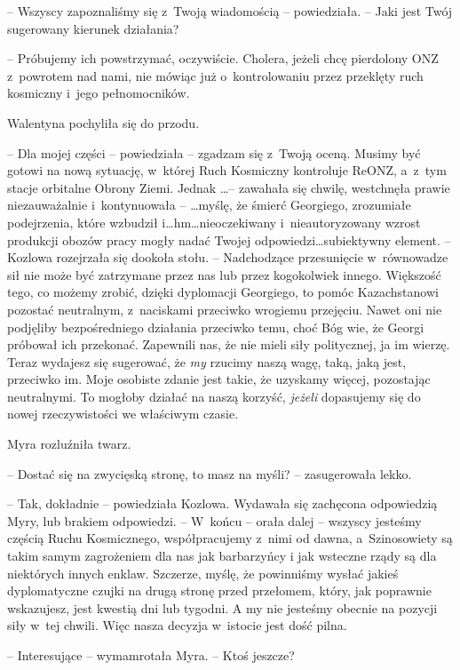\documentclass[oneside,polish,11pt,sfheadings]{mwbk}
\begin{document}
-- Wszyscy
zapoznaliśmy się z~Twoją wiadomością -- powiedziała. -- Jaki jest Twój
sugerowany kierunek działania?

-- Próbujemy ich powstrzymać, oczywiście. Cholera, jeżeli chcę pierdolony
ONZ z~powrotem nad nami, nie mówiąc już o~kontrolowaniu przez przeklęty
ruch kosmiczny i~jego pełnomocników.

Walentyna pochyliła się do przodu. 

-- Dla mojej części -- powiedziała -- zgadzam się z~Twoją oceną. Musimy być gotowi na nową sytuację, w~której
Ruch Kosmiczny kontroluje ReONZ, a~z~tym stacje orbitalne Obrony Ziemi.
Jednak \ldots -- zawahała się chwilę, westchnęła prawie niezauważalnie i~kontynuowała -- \ldots myślę, że śmierć Georgiego, zrozumiałe podejrzenia,
które wzbudził i\ldots hm\ldots nieoczekiwany i~nieautoryzowany wzrost
produkcji obozów pracy mogły nadać Twojej odpowiedzi\ldots subiektywny
element. -- Kozlowa rozejrzała się dookoła stołu. -- Nadchodzące
przesunięcie w~równowadze sił nie może być zatrzymane przez nas lub
przez kogokolwiek innego. Większość tego, co możemy zrobić, dzięki
dyplomacji Georgiego, to pomóc Kazachstanowi pozostać neutralnym, z~naciskami przeciwko wrogiemu przejęciu. Nawet oni nie podjęliby
bezpośredniego działania przeciwko temu, choć Bóg wie, że Georgi
próbował ich przekonać. Zapewnili nas, że nie mieli siły politycznej, ja
im wierzę. Teraz wydajesz się sugerować, że \textit{my} rzucimy naszą
wagę, taką, jaką jest, przeciwko im. Moje osobiste zdanie jest takie, że
uzyskamy więcej, pozostając neutralnymi. To mogłoby działać na naszą
korzyść, \textit{jeżeli} dopasujemy się do nowej rzeczywistości we
właściwym czasie.

Myra rozluźniła twarz. 

-- Dostać się na zwycięską stronę, to masz na
myśli? -- zasugerowała lekko.

-- Tak, dokładnie -- powiedziała Kozlowa. Wydawała się zachęcona
odpowiedzią Myry, lub brakiem odpowiedzi. -- W~końcu -- orała dalej -- wszyscy jesteśmy częścią Ruchu Kosmicznego, współpracujemy z~nimi od
dawna, a~Szinosowiety są takim samym zagrożeniem dla nas jak barbarzyńcy
i jak wsteczne rządy są dla niektórych innych enklaw. Szczerze, myślę,
że powinniśmy wysłać jakieś dyplomatyczne czujki na drugą stronę przed
przełomem, który, jak poprawnie wskazujesz, jest kwestią dni lub
tygodni. A my nie jesteśmy obecnie na pozycji siły w~tej chwili. Więc
nasza decyzja w~istocie jest dość pilna.

-- Interesujące -- wymamrotała Myra. -- Ktoś jeszcze?
\end{document}
